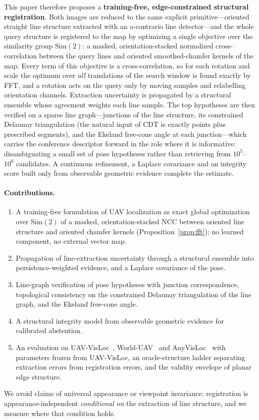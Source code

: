 This paper therefore proposes a \textbf{training-free, edge-constrained
structural registration}. Both images are reduced to the same explicit
primitive---oriented straight line structure extracted with an a-contrario line
detector---and the whole query structure is registered to the map by optimizing
a single objective over the similarity group $\mathrm{Sim}(2)$: a masked,
orientation-stacked normalized cross-correlation between the query lines and
oriented smoothed-chamfer kernels of the map. Every term of this objective is a
cross-correlation, so for each rotation and scale the optimum over \emph{all}
translations of the search window is found exactly by FFT, and a rotation acts
on the query only by moving samples and relabelling orientation channels.
Extraction uncertainty is propagated by a structural ensemble whose agreement
weights each line sample. The top hypotheses are then verified on a sparse line
graph---junctions of the line structure, its constrained Delaunay
triangulation (the natural input of CDT is exactly points plus prescribed
segments), and the Ekeland free-cone angle at each junction---which carries the
conference descriptor forward in the role where it is informative:
disambiguating a small set of pose hypotheses rather than retrieving from
$10^5$--$10^6$ candidates. A continuous refinement, a Laplace covariance and an
integrity score built only from observable geometric evidence complete the
estimate.

\paragraph{Contributions.}
\begin{enumerate}
\item A training-free formulation of UAV localization as exact global
  optimization over $\mathrm{Sim}(2)$ of a masked, orientation-stacked NCC
  between oriented line structure and oriented chamfer kernels
  (Proposition~\ref{prop:fft}); no learned component, no external vector map.
\item Propagation of line-extraction uncertainty through a structural ensemble
  into persistence-weighted evidence, and a Laplace covariance of the pose.
\item Line-graph verification of pose hypotheses with junction
  correspondence, topological consistency on the constrained Delaunay
  triangulation of the line graph, and the Ekeland free-cone angle.
\item A structural integrity model from observable geometric evidence for
  calibrated abstention.
\item An evaluation on UAV-VisLoc~\cite{xu2024uavvisloc},
  World-UAV~\cite{wu2025uavgeoloc} and AnyVisLoc~\cite{ye2026anyvisloc} with
  parameters frozen from UAV-VisLoc, an oracle-structure ladder separating
  extraction errors from registration errors, and the validity envelope of
  planar edge structure.
\end{enumerate}

We avoid claims of universal appearance or viewpoint invariance: registration
is appearance-independent \emph{conditional on} the extraction of line
structure, and we measure where that condition holds.
